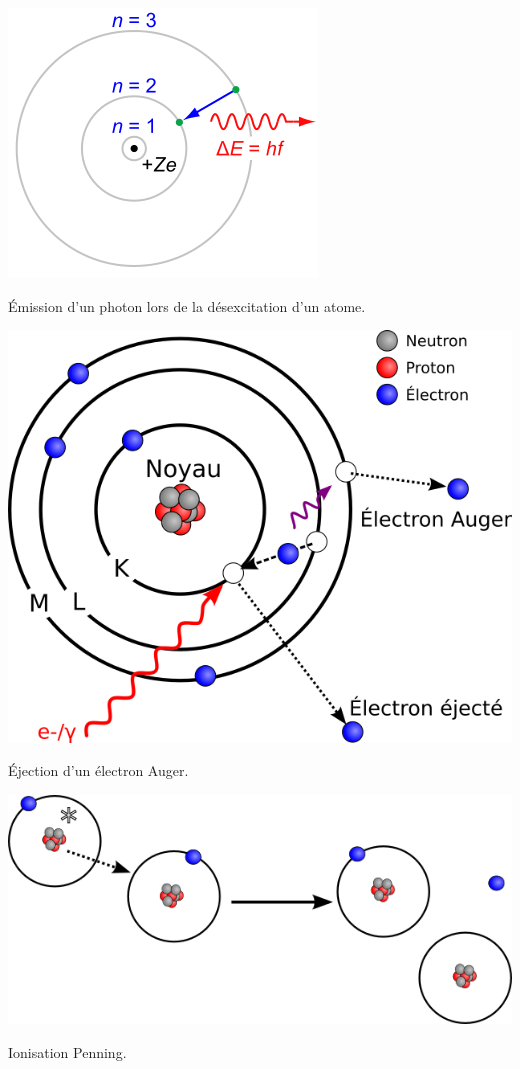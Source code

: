 \marginpar
{
	\centering
	\includegraphics[width=\marginparwidth]{RPC/Photon.png}
	\captionsetup{type=figure}\caption{Émission d'un photon lors de la désexcitation d'un atome.}
	\label{photon}
}
\marginpar
{
	\centering
	\includegraphics[width=\marginparwidth]{RPC/Auger.png}
	\captionsetup{type=figure}\caption{Éjection d'un électron Auger.}
	\label{Auger}
}
\marginpar
{
	\centering
	\includegraphics[width=\marginparwidth]{RPC/Penning.png}
	\captionsetup{type=figure}\caption{Ionisation Penning.}
	\label{Penning}
}
